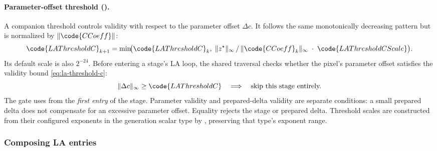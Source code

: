 \paragraph{Parameter-offset threshold ().}
A companion threshold  controls validity with respect
to the parameter offset \(\Delta c\).  It follows the same monotonically
decreasing pattern but is normalized by \(\lVert\code{CCoeff}\rVert\):
\begin{equation}
\code{LAThresholdC}_{k+1}
  = \min\!\bigl(
      \code{LAThresholdC}_k,\;
      \lVert z^\star\rVert_\infty \,/\,
      \lVert\code{CCoeff}_k\rVert_\infty
      \;\cdot\;\code{LAThresholdCScale}
    \bigr).
\label{eq:la-threshold-c}
\end{equation}
Its default scale is also $2^{-24}$. Before entering a stage's LA loop,
the shared traversal checks whether the pixel's
parameter offset satisfies the validity bound \eqref{eq:la-threshold-c}:
\[
\lVert \Delta c \rVert_\infty \ge \code{LAThresholdC}
  \quad\Longrightarrow\quad
  \text{skip this stage entirely.}
\]
The gate uses  from the \emph{first entry} of the
stage. Parameter validity and prepared-delta validity are separate
conditions: a small prepared delta does not compensate for an excessive
parameter offset. Equality rejects the stage or prepared delta.
Threshold scales are constructed from their configured exponents in
the generation scalar type by , preserving
that type's exponent range.

\subsubsection{Composing LA entries}
\label{sec:la-composite}

